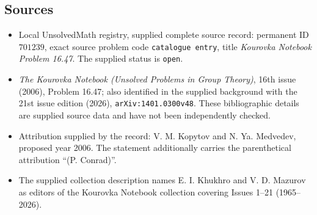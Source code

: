 \documentclass[11pt]{article}
\begin{document}
\subsection{Sources}
\begin{itemize}
\item Local UnsolvedMath registry, supplied complete source record: permanent ID \(701239\), exact source problem code \texttt{catalogue entry}, title \emph{Kourovka Notebook Problem 16.47}. The supplied status is \texttt{open}.
\item \emph{The Kourovka Notebook (Unsolved Problems in Group Theory)}, 16th issue (2006), Problem 16.47; also identified in the supplied background with the 21st issue edition (2026), \texttt{arXiv:1401.0300v48}. These bibliographic details are supplied source data and have not been independently checked.
\item Attribution supplied by the record: V. M. Kopytov and N. Ya. Medvedev, proposed year 2006. The statement additionally carries the parenthetical attribution ``(P. Conrad)''.
\item The supplied collection description names E. I. Khukhro and V. D. Mazurov as editors of the Kourovka Notebook collection covering Issues 1--21 (1965--2026).
\end{itemize}
\end{document}
